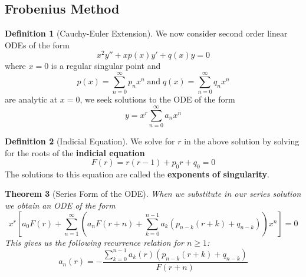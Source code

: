 \documentclass[12pt]{article}
\newtheorem{thm}{Theorem}[section]
\theoremstyle{definition}
\newtheorem{defn}[thm]{Definition}
\theoremstyle{remark}
\numberwithin{equation}{section}
\newcommand\B[1]{\textbf{ #1}}
\begin{document}
\vspace{1cm}


\subsection{Frobenius Method}

\begin{defn}[Cauchy-Euler Extension]
        We now consider second order linear ODEs of the form \begin{equation}
                x^2y''+xp(x)y'+q(x)y = 0
        \end{equation}
        where $x=0$ is a regular singular point and \begin{equation}
                p(x) = \sum\limits_{n=0}^{\infty}p_nx^n\;\text{and}\;q(x) = \sum\limits_{n=0}^{\infty}q_nx^n
        \end{equation}
        are analytic at $x = 0$, we seek solutions to the ODE of the form \begin{equation}
                y = x^r\sum\limits_{n=0}^{\infty}a_nx^n
        \end{equation}
\end{defn}


\vspace{1cm}

\begin{defn}[Indicial Equation]
        We solve for $r$ in the above solution by solving for the roots of the \B{indicial equation} \begin{equation}
                F(r) = r(r-1)+p_0r+q_0 = 0
        \end{equation}
        The solutions to this equation are called the \B{exponents of singularity}.
\end{defn}


\vspace{1cm}



\begin{thm}[Series Form of the ODE]
        When we substitute in our series solution we obtain an ODE of the form \begin{equation}
                x^r\left[a_0F(r)+\sum\limits_{n=1}^{\infty}\left(a_nF(r+n)+\sum\limits_{k=0}^{n-1}a_k(p_{n-k}(r+k)+q_{n-k})\right)x^n\right] = 0
        \end{equation}
        This gives us the following recurrence relation for $n \geq 1$: \begin{equation}
                a_n(r) = -\frac{\sum\limits_{k=0}^{n-1}a_k(r)(p_{n-k}(r+k)+q_{n-k})}{F(r+n)}
        \end{equation}
\end{thm}
\end{document}
